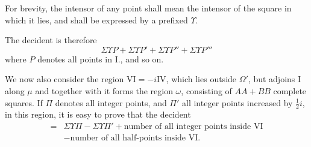 For brevity, the intensor of any point shall mean the intensor of the square in which it lies, and shall be expressed by a prefixed $\Upsilon$.

The decident is therefore
\[
\Sigma\Upsilon P+\Sigma\Upsilon P'+\Sigma\Upsilon P''+\Sigma\Upsilon P'''
\]
where $P$ denotes all points in I., and so on.


We now also consider the region $\mathrm{VI}=-i\mathrm{IV}$, which lies outside $\Omega'$, but adjoins I along $\mu$ and together with it forms the region $\omega$, consisting of $AA+BB$ complete squares. If $\Pi$ denotes all integer points, and $\Pi'$ all integer points increased by $\frac12i$, in this region, it is easy to prove that the decident
\[
\begin{aligned}
={}&\Sigma\Upsilon\Pi-\Sigma\Upsilon\Pi'+\text{number of all integer points inside VI}\\
&-\text{number of all half-points inside VI.}
\end{aligned}
\]
